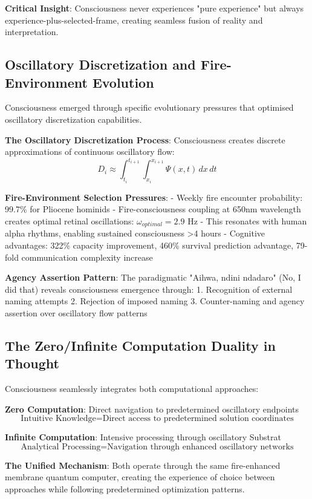 \documentclass[12pt,a4paper]{article}
\begin{document}
\textbf{Critical Insight}: Consciousness never experiences "pure experience" but always experience-plus-selected-frame, creating seamless fusion of reality and interpretation.

\subsection{Oscillatory Discretization and Fire-Environment Evolution}

Consciousness emerged through specific evolutionary pressures that optimised oscillatory discretization capabilities.

\textbf{The Oscillatory Discretization Process}: Consciousness creates discrete approximations of continuous oscillatory flow:
$$D_i \approx \int_{t_i}^{t_{i+1}} \int_{x_i}^{x_{i+1}} \Psi(x,t) \, dx \, dt$$

\textbf{Fire-Environment Selection Pressures}: 
- Weekly fire encounter probability: 99.7\% for Pliocene hominids
- Fire-consciousness coupling at 650nm wavelength creates optimal retinal oscillations: $\omega_{optimal} = 2.9$ Hz
- This resonates with human alpha rhythms, enabling sustained consciousness >4 hours
- Cognitive advantages: 322\% capacity improvement, 460\% survival prediction advantage, 79-fold communication complexity increase

\textbf{Agency Assertion Pattern}: The paradigmatic "Aihwa, ndini ndadaro" (No, I did that) reveals consciousness emergence through:
1. Recognition of external naming attempts
2. Rejection of imposed naming 
3. Counter-naming and agency assertion over oscillatory flow patterns

\subsection{The Zero/Infinite Computation Duality in Thought}

Consciousness seamlessly integrates both computational approaches:

\textbf{Zero Computation}: Direct navigation to predetermined oscillatory endpoints
$$\text{Intuitive Knowledge} = \text{Direct access to predetermined solution coordinates}$$

\textbf{Infinite Computation}: Intensive processing through oscillatory Substrat
$$\text{Analytical Processing} = \text{Navigation through enhanced oscillatory networks}$$

\textbf{The Unified Mechanism}: Both operate through the same fire-enhanced membrane quantum computer, creating the experience of choice between approaches while following predetermined optimization patterns.
\end{document}
